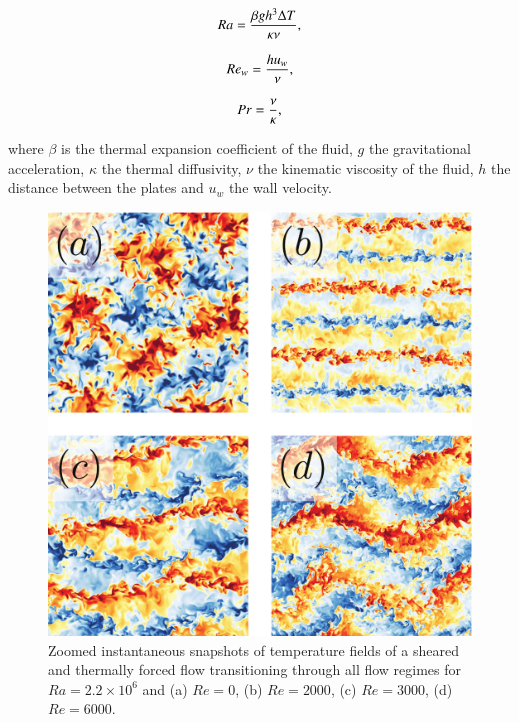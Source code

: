 \documentclass[final,5p,times,twocolumn]{elsarticle}
\begin{document}
\begin{equation} %
Ra= \frac{\beta gh^3\Delta T}{\kappa\nu}, 
\label{eqn:Ra} \\[8pt]
\end{equation}

\begin{equation} %
Re_w= \frac{hu_w}{\nu},
\label{eqn:Re} \\[8pt]
\end{equation}

\begin{equation} %
Pr= \frac{\nu}{\kappa},
\label{eqn:Pr} \\[8pt]
\end{equation}


where $ \beta $ is the thermal expansion coefficient of the fluid, $ g $ the
gravitational acceleration, $ \kappa $ the thermal diffusivity, $ \nu $ the
kinematic viscosity of the fluid, $ h $ the distance between the plates and
$ u_w $ the wall velocity.

\begin{figure}
	\centering
	\includegraphics[width=\linewidth]{squaredoverview}%
	\caption{\label{fig:overview} Zoomed instantaneous snapshots of temperature fields
of a sheared and thermally forced flow transitioning through all flow regimes
for $ Ra=2.2 \times 10^6 $ and (a) $ Re=0 $, (b) $ Re=2000 $, (c) $ Re=3000 $, (d) $ Re=6000 $.}
\end{figure}
\end{document}
